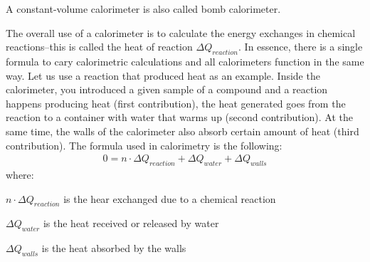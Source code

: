 \documentclass[main.tex]{subfiles}
\begin{document}
\begin{description}
\begin{marginfigure}[-4cm]
      \caption{A constant-volume calorimeter is also called bomb calorimeter.}
      \label{fig:marginfig}
   \end{marginfigure}
    
\item[\docfilehook{Calorimetry formula}{Calorimetry formula}] 
The overall use of a calorimeter is to calculate the energy exchanges in chemical reactions--this is called the heat of reaction $\Delta Q_{reaction}$. In essence, there is a single formula to cary calorimetric calculations and all calorimeters function in the same way. Let us use a reaction that produced heat as an example. Inside the calorimeter, you introduced a given sample of a compound and a reaction happens producing heat (first contribution), the heat generated goes from the reaction to a container with water that warms up (second contribution). At the same time, the walls of the calorimeter also absorb certain amount of heat (third contribution). The formula used in calorimetry is the following: 
\begin{equation*}\begin{split}
 0=n\cdot\Delta Q_{reaction}+\Delta Q_{water}+\Delta Q_{walls} 
\end{split}\end{equation*}
where:
\begin{where}
 \item $n\cdot\Delta Q_{reaction}$   is the hear exchanged due to a chemical reaction
\item $\Delta Q_{water}$    is the heat received or released by water 
 \item $\Delta Q_{walls}$   is the heat absorbed by the walls
\end{where}


\end{description}
\end{document}
